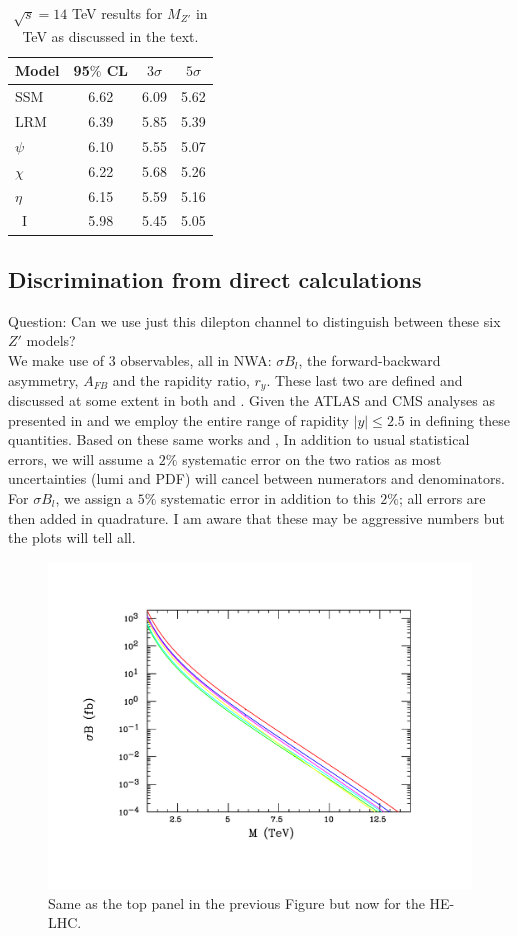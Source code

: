 %
\begin{table}
\centering
\begin{tabular}{|l|c|c|c|} \hline\hline
  Model &   95$\%$ CL     &  $3\sigma$     &   $5\sigma$   \\
\hline
SSM    &     6.62     &  6.09        &  5.62     \\
LRM    &   6.39     & 5.85        & 5.39  \\
$\psi$    &  6.10   & 5.55   & 5.07  \\
$\chi$   &  6.22    & 5.68    & 5.26   \\
$\eta$   &  6.15     &  5.59  &  5.16   \\
~I        & 5.98   &  5.45   &  5.05  \\
\hline\hline
\end{tabular}
\caption{ $\sqrt s=14$ TeV results for $M_{Z'}$ in TeV as discussed in the text. }
\label{spec}
\end{table}
%


\subsection{Discrimination from direct calculations}
Question: Can we use just this dilepton channel to distinguish between these six $Z'$ models? 
\newline
\\
We make use of 3 observables, all in NWA: $\sigma B_l$, the forward-backward asymmetry, $A_{FB}$ and the rapidity ratio, $r_y$. These last two are defined 
and discussed at some extent in both \cite{Rizzo:2014xma} and \cite{Han:2013mra}.  Given the ATLAS and CMS analyses as presented in \cite{Han:2016qpd} 
and \cite{CMS:2017zzj} we employ the entire range of rapidity $|y|\leq 2.5$ in defining these quantities. Based on these same works and \cite{Han:2013mra}, 
In addition to usual statistical errors, we will assume a $2\%$ systematic error on the two ratios as most uncertainties (lumi and PDF) will cancel between numerators 
and denominators. For $\sigma B_l$, we assign a $5\%$ systematic error in addition to this $2\%$; all errors are then added in quadrature. I am aware that these may 
be aggressive numbers but the plots will tell all. 


\begin{figure}[htbp]
  \centering
\includegraphics[trim={2cm 2cm 2cm 2cm},clip,width=0.49\columnwidth]{Fig/zp27tev-ref.pdf}
\caption{ Same as the top panel in the previous Figure but now for the HE-LHC.}
\label{toy2}
\end{figure}



